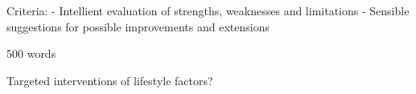 Criteria:
- Intellient evaluation of strengths, weaknesses and limitations
- Sensible suggestions for possible improvements and extensions

500 words

Targeted interventions of lifestyle factors?
